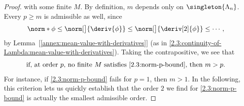 \begin{proof}
with some finite $M$. By definition, $m$ depends only on $\singleton{\Lambda_n}$. Every $p \geq m$ is admissible as well, %
since %
% 
\begin{equation}
  \norm*{\phi} \leq \norm[\big]{\deriv{\phi}} \leq \norm[\big]{\deriv[2]{\phi}} \leq \cdots,  %
\end{equation}
%
by Lemma~[\ref{annex:mean-value-with-derivatives}] %
(as in \eqref{2.3:continuity-of-Lambda:mean-value-with-derivatives}). Taking the contrapositive, we see that 
% 
\begin{equation}
  \text{if, at order $p$, no finite $M$ satisfies \eqref{2.3:norm-p-bound}, then $m > p$.} \label{2.3:below-minimal-order}
\end{equation}
%
For instance, if \eqref{2.3:norm-p-bound} fails for $p=1$, then $ m > 1$. In the following, this criterion lets us quickly 
establish that the order $2$ we find for \eqref{2.3:norm-p-bound} is actually the smallest admissible order.

\end{proof}
